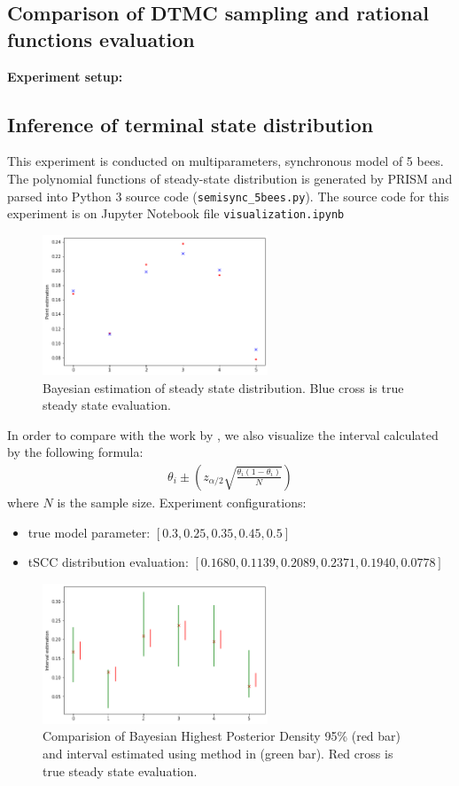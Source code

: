 \documentclass[12pt]{article}
\theoremstyle{definition}
\begin{document}
\subsection{Comparison of DTMC sampling and rational functions evaluation}
\textbf{Experiment setup:}

\subsection{Inference of terminal state distribution}
This experiment is conducted on multiparameters, synchronous model of 5 bees. The polynomial
functions of steady-state distribution is generated by PRISM and parsed into Python 3 source code
(\texttt{semisync\_5bees.py}). The source code for this
experiment is on Jupyter Notebook file \texttt{visualization.ipynb}
\begin{figure}[H]
  \centering
  \includegraphics[width=0.6\textwidth,keepaspectratio]{figures/point_estimation.png}
  \caption{Bayesian estimation of steady state distribution. Blue cross is true
    steady state evaluation.}
\end{figure}
In order to compare with the work by \cite{hajnal2019data}, we also visualize
the interval calculated by the following formula:
\begin{align*}
  \theta_i \pm (z_{\alpha / 2}\sqrt{\frac{\theta_i(1-\theta_i)}{N}})
\end{align*}
where $N$ is the sample size. Experiment configurations:
\begin{itemize}
\item true model parameter: $[0.3, 0.25, 0.35, 0.45, 0.5]$
\item tSCC distribution evaluation: $[0.1680, 0.1139, 0.2089, 0.2371, 0.1940, 0.0778]$ 
\end{itemize}

\begin{figure}[H]
  \centering
  \includegraphics[width=0.6\textwidth,keepaspectratio]{figures/interval_estimation.png}
  \caption{Comparision of Bayesian Highest Posterior Density 95\% (red bar) and interval
    estimated using method in \cite{hajnal2019data} (green bar). Red cross is
    true steady state evaluation.}
\end{figure}
\end{document}
